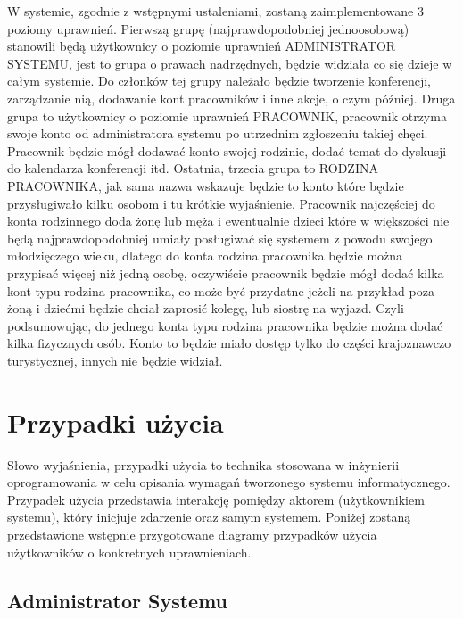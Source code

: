 W systemie, zgodnie z wstępnymi ustaleniami, zostaną zaimplementowane 3 poziomy uprawnień. \newline
Pierwszą grupę (najprawdopodobniej jednoosobową) stanowili będą użytkownicy o poziomie uprawnień ADMINISTRATOR SYSTEMU, jest to grupa o prawach nadrzędnych, będzie widziała co się dzieje w całym systemie. Do członków tej grupy należało będzie tworzenie konferencji, zarządzanie nią, dodawanie kont pracowników i inne akcje, o czym później. \newline
Druga grupa to użytkownicy o poziomie uprawnień PRACOWNIK, pracownik otrzyma swoje konto od administratora systemu po utrzednim zgłoszeniu takiej chęci. Pracownik będzie mógł dodawać konto swojej rodzinie, dodać temat do dyskusji do kalendarza konferencji itd. \newline
Ostatnia, trzecia grupa to RODZINA PRACOWNIKA, jak sama nazwa wskazuje będzie to konto które będzie przysługiwało kilku osobom i tu krótkie wyjaśnienie. Pracownik najczęściej do konta rodzinnego doda żonę lub męża i ewentualnie dzieci które w większości nie będą najprawdopodobniej umiały posługiwać się systemem z powodu swojego młodzięczego wieku, dlatego do konta rodzina pracownika będzie można przypisać więcej niż jedną osobę, oczywiście pracownik będzie mógł dodać kilka kont typu rodzina pracownika, co może być przydatne jeżeli na przykład poza żoną i dziećmi będzie chciał zaprosić kolegę, lub siostrę na wyjazd. Czyli podsumowując, do jednego konta typu rodzina pracownika będzie można dodać kilka fizycznych osób. Konto to będzie miało dostęp tylko do części krajoznawczo turystycznej, innych nie będzie widział.

\section{Przypadki użycia}

Słowo wyjaśnienia, przypadki użycia to technika stosowana w inżynierii oprogramowania w celu opisania wymagań tworzonego systemu informatycznego. Przypadek użycia przedstawia interakcję pomiędzy aktorem (użytkownikiem systemu), który inicjuje zdarzenie oraz samym systemem.\newline
Poniżej zostaną przedstawione wstępnie przygotowane diagramy przypadków użycia użytkowników o konkretnych uprawnieniach.

\subsection{Administrator Systemu}


